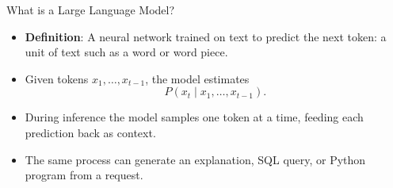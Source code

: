 \documentclass[aspectratio=169]{beamer}
\begin{document}
\begin{frame}{What is a Large Language Model?}
  \begin{itemize}
    \item \textbf{Definition}: A neural network trained on text to predict the next token: a unit of text such as a word or word piece.
    \item Given tokens $x_1, \dots, x_{t-1}$, the model estimates
      \[
        P(x_t \mid x_1, \dots, x_{t-1}).
      \]
    \item During inference the model samples one token at a time, feeding each prediction back as context.
    \item The same process can generate an explanation, SQL query, or Python program from a request.
  \end{itemize}
\end{frame}
\end{document}
